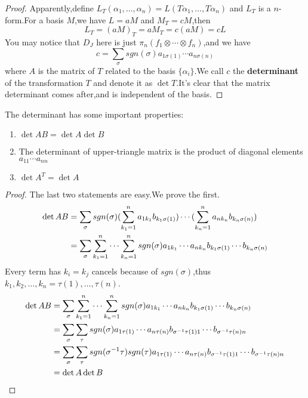 \documentclass{article}
\begin{document}
\begin{proof}
	Apparently,define $L_T(\alpha_1,\dots,\alpha_n)=L(T\alpha_1,\dots,T\alpha_n)$ and $L_T$ is a $n$-form.For a basis $M$,we have $L=aM$ and $M_T=cM$,then
	\[L_T=(aM)_T=aM_T=c(aM)=cL\]
	You may notice that $D_J$ here is just $\pi_n(f_{1}\otimes\cdots\otimes f_{n})$,and we have
	\[c=\sum\limits_\sigma sgn(\sigma)a_{1\sigma(1)}\cdots a_{n\sigma(n)}\]
	where $A$ is the matrix of $T$ related to the basis $\{\alpha_i\}$.We call $c$ the \textbf{determinant} of the transformation $T$ and denote it as $\det T$.It's clear that the matrix determinant comes after,and is independent of the basis.
\end{proof}
\begin{thm}
	The determinant has some important properties:
	\begin{enumerate}
		\item $\det AB=\det A\det B$
		\item The determinant of upper-triangle matrix is the product of diagonal elements $a_{11}\cdots a_{nn}$
		\item $\det A^T=\det A$
	\end{enumerate}
\end{thm}
\begin{proof}
	The last two statements are easy.We prove the first.
	\begin{align}
		\det AB&=\sum\limits_{\sigma}sgn(\sigma)(\sum\limits_{k_1=1}^na_{1k_1}b_{k_1\sigma(1)})\cdots(\sum\limits_{k_n=1}^na_{nk_n}b_{k_n\sigma(n)})\notag\\
		&=\sum\limits_{\sigma}\sum\limits_{k_1=1}^n\cdots\sum\limits_{k_n=1}^nsgn(\sigma)a_{1k_1}\cdots a_{nk_n}b_{k_1\sigma(1)}\cdots b_{k_n\sigma(n)}\notag
	\end{align}
	Every term has $k_i=k_j$ cancels because of $sgn(\sigma)$,thus $k_1,k_2,\dots,k_n=\tau(1),\dots,\tau(n)$.
	\begin{align}
		\det AB&=\sum\limits_{\sigma}\sum\limits_{k_1=1}^n\cdots\sum\limits_{k_n=1}^nsgn(\sigma)a_{1k_1}\cdots a_{nk_n}b_{k_1\sigma(1)}\cdots b_{k_n\sigma(n)}\notag\\
		&=\sum\limits_{\sigma}\sum\limits_{\tau}sgn(\sigma)a_{1\tau(1)}\cdots a_{n\tau(n)}b_{\sigma^{-1}\tau(1)1}\cdots b_{\sigma^{-1}\tau(n)n}\notag\\
		&=\sum\limits_{\sigma}\sum\limits_{\tau}sgn(\sigma^{-1}\tau)sgn(\tau)a_{1\tau(1)}\cdots a_{n\tau(n)}b_{\sigma^{-1}\tau(1)1}\cdots b_{\sigma^{-1}\tau(n)n}\notag\\
		&=\det A\det B\notag
	\end{align}
\end{proof}
\end{document}
